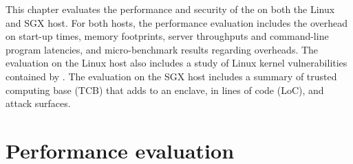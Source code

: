 This chapter evaluates the performance and security of the \graphene{} \libos{} on both the Linux and SGX host.
For both hosts,
the performance evaluation includes the overhead on start-up times, memory footprints, server throughputs and command-line program latencies, and micro-benchmark results regarding \linuxapi{} overheads.
The evaluation on the Linux host also includes a study of Linux kernel vulnerabilities contained by \graphene{}.
The evaluation on the SGX host includes a summary of trusted computing base (TCB) that \graphenesgx{} adds to an enclave, in lines of code (LoC), and attack surfaces.











\section{Performance evaluation}
\label{sec:eval:perf}





